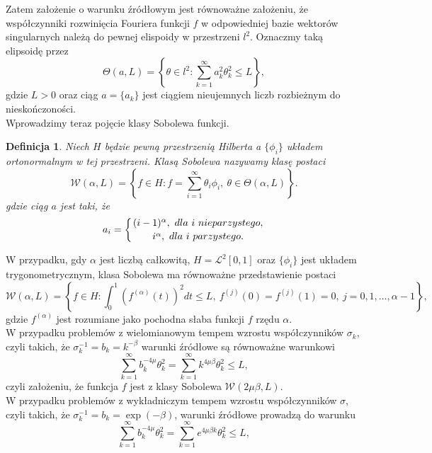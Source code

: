 \documentclass{mwart}
\newtheorem{df}{Definicja}
\begin{document}
Zatem założenie o warunku źródłowym jest równoważne założeniu, że współczynniki rozwinięcia Fouriera funkcji $f$ w odpowiedniej bazie wektorów singularnych należą do pewnej elispoidy w przestrzeni $l^2$. Oznaczmy taką elipsoidę przez
\begin{displaymath}
\Theta(a,L)=\left\{\theta\in l^2\colon \sum_{k=1}^{\infty}a_k^2\theta_k^2\leq L\right\},
\end{displaymath}
gdzie $L>0$ oraz ciąg $a=\{a_k\}$ jest ciągiem nieujemnych liczb rozbieżnym do nieskończoności.\\
Wprowadzimy teraz pojęcie klasy Sobolewa funkcji.
\begin{df}
Niech $H$ będzie pewną przestrzenią Hilberta a $\{\phi_i\}$ układem ortonormalnym w tej przestrzeni. Klasą Sobolewa nazywamy klasę postaci 
\begin{displaymath}
\mathcal{W}(\alpha,L)=\left\{f\in H\colon f=\sum_{i=1}^{\infty}\theta_i\phi_i,\ \theta\in \Theta(\alpha,L)\right\}.
\end{displaymath}
gdzie ciąg $a$ jest taki, że 
\begin{displaymath}
a_i=\left\{{(i-1)^{\alpha},\ dla\ i\ nieparzystego,}\atop {i^{\alpha},\ dla\ i\ parzystego.}\right.
\end{displaymath}
\end{df}
W przypadku, gdy $\alpha$ jest liczbą całkowitą, $H=\mathcal{L}^2[0,1]$ oraz $\{\phi_i\}$ jest układem trygonometrycznym, klasa Sobolewa ma równoważne przedstawienie postaci
\begin{displaymath}
\mathcal{W}(\alpha,L)=\left\{f\in H\colon\int_0^1\left(f^{(\alpha)}(t)\right)^2dt\leq L,\ f^{(j)}(0)=f^{(j)}(1)=0,\ j=0,1,\dots ,\alpha -1\right\},
\end{displaymath}
gdzie $f^{(\alpha)}$ jest rozumiane jako pochodna słaba funkcji $f$ rzędu $\alpha$. \\
W przypadku problemów z wielomianowym tempem wzrostu współczynników $\sigma_k$, czyli takich, że $\sigma_k^{-1}=b_k=k^{-\beta}$ warunki źródłowe są równoważne warunkowi
\begin{displaymath}
\sum_{k=1}^{\infty}b_k^{-4\mu} \theta_k^2=\sum_{k=1}^{\infty}k^{4\mu\beta}\theta_k^2\leq L,
\end{displaymath}
czyli założeniu, że funkcja $f$ jest z klasy Sobolewa $\mathcal{W}(2\mu\beta,L)$.\\
W przypadku problemów z wykładniczym tempem wzrostu współczynników $\sigma$, czyli takich, że $\sigma_k^{-1}=b_k=\exp(-\beta)$, warunki źródłowe prowadzą do warunku
\begin{displaymath}
\sum_{k=1}^{\infty}b_k^{-4\mu} \theta_k^2=\sum_{k=1}^{\infty}e^{4\mu\beta k}\theta_k^2\leq L,
\end{displaymath}
\end{document}

